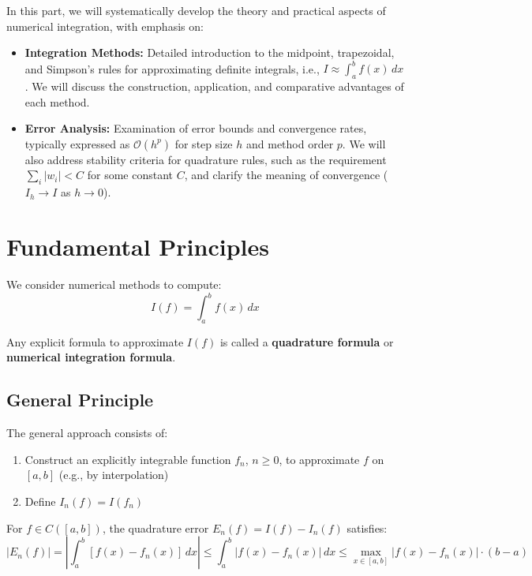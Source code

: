 In this part, we will systematically develop the theory and practical aspects of numerical integration, with emphasis on:

\begin{itemize}
  \item \textbf{Integration Methods:} Detailed introduction to the midpoint, trapezoidal, and Simpson's rules for approximating definite integrals, i.e., \(I \approx \int_a^b f(x) \, dx\). We will discuss the construction, application, and comparative advantages of each method.
  \item \textbf{Error Analysis:} Examination of error bounds and convergence rates, typically expressed as \(\mathcal{O}(h^p)\) for step size \(h\) and method order \(p\). We will also address stability criteria for quadrature rules, such as the requirement \(\sum_i |w_i| < C\) for some constant \(C\), and clarify the meaning of convergence (\(I_h \to I\) as \(h \to 0\)).
\end{itemize}

\section{Fundamental Principles}

We consider numerical methods to compute:
\begin{equation}
    I(f) = \int_a^b f(x) \, dx
\end{equation}

Any explicit formula to approximate $I(f)$ is called a \textbf{quadrature formula} or \textbf{numerical integration formula}.

\subsection{General Principle}

The general approach consists of:
\begin{enumerate}
    \item Construct an explicitly integrable function $f_n$, $n \geq 0$, to approximate $f$ on $[a,b]$ (e.g., by interpolation)
    \item Define $I_n(f) = I(f_n)$
\end{enumerate}

For $f \in C([a,b])$, the quadrature error $E_n(f) = I(f) - I_n(f)$ satisfies:
\begin{equation}
    |E_n(f)| = \left|\int_a^b [f(x) - f_n(x)] \, dx\right| \leq \int_a^b |f(x) - f_n(x)| \, dx \leq \max_{x \in [a,b]} |f(x) - f_n(x)| \cdot (b-a)
\end{equation}

